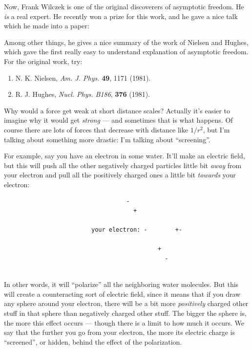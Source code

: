 \documentclass{article}
\def\tightlist{}
\renewcommand{\texttt}[1]{%
  \begingroup
  \ttfamily
  \begingroup\lccode`~=`/\lowercase{\endgroup\def~}{/\discretionary{}{}{}}%
  \begingroup\lccode`~=`[\lowercase{\endgroup\def~}{[\discretionary{}{}{}}%
  \begingroup\lccode`~=`.\lowercase{\endgroup\def~}{.\discretionary{}{}{}}%
  \catcode`/=\active\catcode`[=\active\catcode`.=\active
  \scantokens{#1\noexpand}%
  \endgroup
}
\begin{document}
Now, Frank Wilczek is one of the original discoverers of asymptotic
freedom. He \emph{is} a real expert. He recently won a prize for this
work, and he gave a nice talk which he made into a paper:


Among other things, he gives a nice summary of the work of Nielsen and
Hughes, which gave the first really easy to understand explanation of
asymptotic freedom. For the original work, try:

\begin{enumerate}
\def\labelenumi{\arabic{enumi})}
\setcounter{enumi}{1}
\item
  N. K. Nielsen, \emph{Am. J. Phys.} \textbf{49}, 1171 (1981).
\item
  R. J. Hughes, \emph{Nucl. Phys. B186}, \textbf{376} (1981).
\end{enumerate}

Why would a force get weak at short distance scales? Actually it's
easier to imagine why it would get \emph{strong} --- and sometimes that
is what happens. Of course there are lots of forces that decrease with
distance like \(1/r^2\), but I'm talking about something more drastic:
I'm talking about ``screening''.

For example, say you have an electron in some water. It'll make an
electric field, but this will push all the other negatively charged
particles little bit \emph{away} from your electron and pull all the
positively charged ones a little bit \emph{towards} your electron:

\begin{verbatim}
                                   -
                                     +

                         your electron: -        +-
 
                                            +
                                              -
                      
\end{verbatim}

In other words, it will ``polarize'' all the neighboring water
molecules. But this will create a counteracting sort of electric field,
since it means that if you draw any sphere around your electron, there
will be a bit more \emph{positively} charged other stuff in that sphere
than negatively charged other stuff. The bigger the sphere is, the more
this effect occurs --- though there is a limit to how much it occurs. We
say that the further you go from your electron, the more its electric
charge is ``screened'', or hidden, behind the effect of the
polarization.
\end{document}
